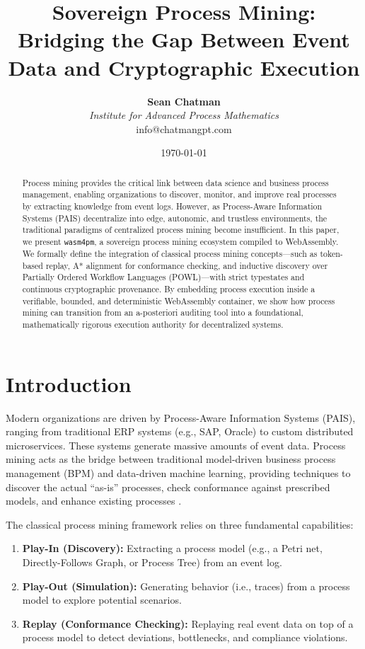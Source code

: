 \documentclass[11pt,a4paper]{article}
\title{\textbf{Sovereign Process Mining: Bridging the Gap Between Event Data and Cryptographic Execution}}
\author{
    \textbf{Sean Chatman}\\
    \textit{Institute for Advanced Process Mathematics}\\
    info@chatmangpt.com
}
\date{\today}
\begin{document}
\maketitle

\begin{abstract}
Process mining provides the critical link between data science and business process management, enabling organizations to discover, monitor, and improve real processes by extracting knowledge from event logs. However, as Process-Aware Information Systems (PAIS) decentralize into edge, autonomic, and trustless environments, the traditional paradigms of centralized process mining become insufficient. In this paper, we present \texttt{wasm4pm}, a sovereign process mining ecosystem compiled to WebAssembly. We formally define the integration of classical process mining concepts---such as token-based replay, A* alignment for conformance checking, and inductive discovery over Partially Ordered Workflow Languages (POWL)---with strict typestates and continuous cryptographic provenance. By embedding process execution inside a verifiable, bounded, and deterministic WebAssembly container, we show how process mining can transition from an a-posteriori auditing tool into a foundational, mathematically rigorous execution authority for decentralized systems.
\end{abstract}

\section{Introduction}
Modern organizations are driven by Process-Aware Information Systems (PAIS), ranging from traditional ERP systems (e.g., SAP, Oracle) to custom distributed microservices. These systems generate massive amounts of event data. Process mining acts as the bridge between traditional model-driven business process management (BPM) and data-driven machine learning, providing techniques to discover the actual ``as-is'' processes, check conformance against prescribed models, and enhance existing processes \cite{vanderAalst2016}.

The classical process mining framework relies on three fundamental capabilities:
\begin{enumerate}
    \item \textbf{Play-In (Discovery):} Extracting a process model (e.g., a Petri net, Directly-Follows Graph, or Process Tree) from an event log.
    \item \textbf{Play-Out (Simulation):} Generating behavior (i.e., traces) from a process model to explore potential scenarios.
    \item \textbf{Replay (Conformance Checking):} Replaying real event data on top of a process model to detect deviations, bottlenecks, and compliance violations.
\end{enumerate}
\end{document}
